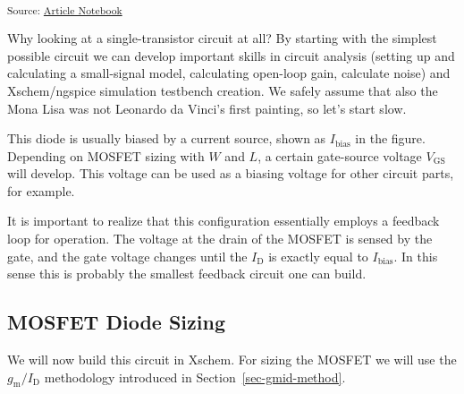 \documentclass[
  a4paper,
  DIV=11,
  numbers=noendperiod]{scrartcl}
\begin{document}
\textsubscript{Source:
\href{https://iic-jku.github.io/analog-circuit-design/index.qmd.html}{Article
Notebook}}

Why looking at a single-transistor circuit at all? By starting with the
simplest possible circuit we can develop important skills in circuit
analysis (setting up and calculating a small-signal model, calculating
open-loop gain, calculate noise) and Xschem/ngspice simulation testbench
creation. We safely assume that also the Mona Lisa was not Leonardo da
Vinci's first painting, so let's start slow.

This diode is usually biased by a current source, shown as
\(I_\mathrm{bias}\) in the figure. Depending on MOSFET sizing with \(W\)
and \(L\), a certain gate-source voltage \(V_\mathrm{GS}\) will develop.
This voltage can be used as a biasing voltage for other circuit parts,
for example.

\begin{tcolorbox}[enhanced jigsaw, titlerule=0mm, left=2mm, coltitle=black, toprule=.15mm, breakable, opacitybacktitle=0.6, colframe=quarto-callout-note-color-frame, bottomtitle=1mm, toptitle=1mm, opacityback=0, colbacktitle=quarto-callout-note-color!10!white, title=\textcolor{quarto-callout-note-color}{\faInfo}\hspace{0.5em}{Feedback in the MOSFET Diode}, arc=.35mm, rightrule=.15mm, colback=white, bottomrule=.15mm, leftrule=.75mm]

It is important to realize that this configuration essentially employs a
feedback loop for operation. The voltage at the drain of the MOSFET is
sensed by the gate, and the gate voltage changes until the
\(I_\mathrm{D}\) is exactly equal to \(I_\mathrm{bias}\). In this sense
this is probably the smallest feedback circuit one can build.

\end{tcolorbox}

\subsection{MOSFET Diode Sizing}\label{mosfet-diode-sizing}

We will now build this circuit in Xschem. For sizing the MOSFET we will
use the \(g_\mathrm{m}/I_\mathrm{D}\) methodology introduced in
Section~\ref{sec-gmid-method}.
\end{document}
